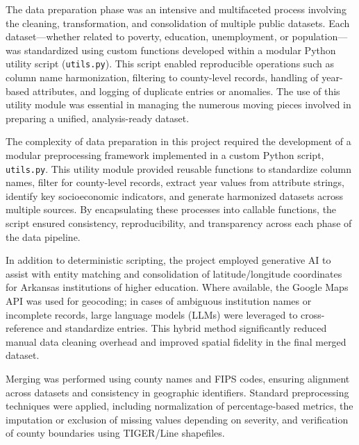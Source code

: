 \documentclass{llncs}
\begin{document}
The data preparation phase was an intensive and multifaceted process involving the cleaning, transformation, and consolidation of multiple public datasets. Each dataset—whether related to poverty, education, unemployment, or population—was standardized using custom functions developed within a modular Python utility script (\texttt{utils.py}). This script enabled reproducible operations such as column name harmonization, filtering to county-level records, handling of year-based attributes, and logging of duplicate entries or anomalies. The use of this utility module was essential in managing the numerous moving pieces involved in preparing a unified, analysis-ready dataset.

\begin{tcolorbox}[colback=gray!5!white, colframe=black, title=Technical Note: Modular Utilities and Generative Tools]

The complexity of data preparation in this project required the development of a modular preprocessing framework implemented in a custom Python script, \texttt{utils.py}. This utility module provided reusable functions to standardize column names, filter for county-level records, extract year values from attribute strings, identify key socioeconomic indicators, and generate harmonized datasets across multiple sources. By encapsulating these processes into callable functions, the script ensured consistency, reproducibility, and transparency across each phase of the data pipeline.

In addition to deterministic scripting, the project employed generative AI to assist with entity matching and consolidation of latitude/longitude coordinates for Arkansas institutions of higher education. Where available, the Google Maps API was used for geocoding; in cases of ambiguous institution names or incomplete records, large language models (LLMs) were leveraged to cross-reference and standardize entries. This hybrid method significantly reduced manual data cleaning overhead and improved spatial fidelity in the final merged dataset.

\end{tcolorbox}

Merging was performed using county names and FIPS codes, ensuring alignment across datasets and consistency in geographic identifiers. Standard preprocessing techniques were applied, including normalization of percentage-based metrics, the imputation or exclusion of missing values depending on severity, and verification of county boundaries using TIGER/Line shapefiles.
\end{document}
